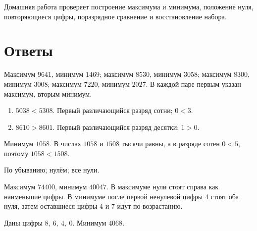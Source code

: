 
\begin{teacherbox}[Назначение]
  Домашняя работа проверяет построение максимума и минимума, положение нуля,
  повторяющиеся цифры, поразрядное сравнение и восстановление набора.
\end{teacherbox}

\section{Ответы}

\begin{teacherbox}
  Максимум \(9641\), минимум \(1469\); максимум \(8530\), минимум \(3058\);
  максимум \(8300\), минимум \(3008\); максимум \(7220\), минимум \(2027\).
  В каждой паре первым указан максимум, вторым \textemdash{} минимум.
\end{teacherbox}

\begin{teacherbox}[2. Сравнение]
  \begin{enumerate}
    \item \(5038<5308\). Первый различающийся разряд \textemdash{} сотни; \(0<3\).
    \item \(8610>8601\). Первый различающийся разряд \textemdash{} десятки; \(1>0\).
  \end{enumerate}
\end{teacherbox}

\begin{teacherbox}[3. Исправление]
  Минимум \(1058\). В числах \(1058\) и \(1508\) тысячи равны, а в разряде
  сотен \(0<5\), поэтому \(1058<1508\).
\end{teacherbox}

\begin{teacherbox}[4. Правило]
  По убыванию; нулём; все нули.
\end{teacherbox}

\newpage

\begin{teacherbox}
  Максимум \(74400\), минимум \(40047\). В максимуме нули стоят справа как
  наименьшие цифры. В минимуме после первой ненулевой цифры 4 стоят оба нуля,
  затем оставшиеся цифры 4 и 7 идут по возрастанию.
\end{teacherbox}

\begin{teacherbox}[6. Восстановление]
  Даны цифры \(8,\ 6,\ 4,\ 0\). Минимум \(4068\).
\end{teacherbox}

